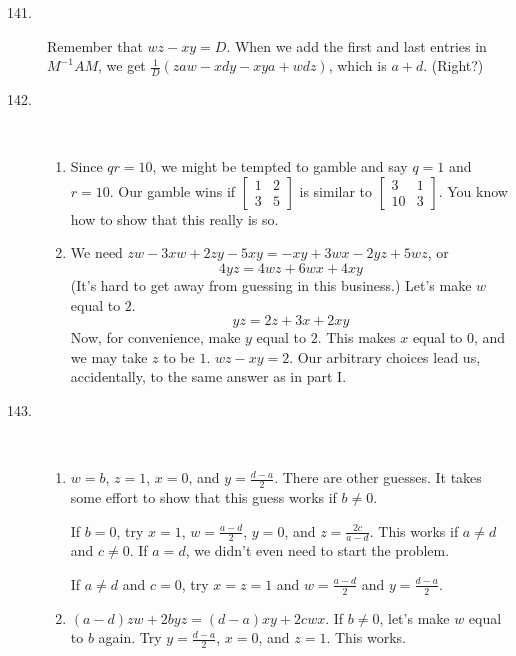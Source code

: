 \documentclass{article}
\begin{document}
\begin{description}
  \item[141.] Remember that $wz - xy = D$. When we add the first and last entries in $M^{-1} AM$, we get $\frac{1}{D} ( zaw-xdy-xya+wdz )$, which is $a+d$. (Right?)

  \item[142.] $\ $
    \begin{enumerate}[\hspace{1cm}(I)]
      \item Since $qr = 10$, we might be tempted to gamble and say $q = 1$ and $r = 10$. Our gamble wins if $\begin{bmatrix} 1 & 2 \\ 3 & 5 \end{bmatrix}$ is similar to $\begin{bmatrix} 3 & 1 \\ 10 & 3 \end{bmatrix}$. You know how to show that this really is so.
      \item We need $zw - 3xw + 2zy -5xy = -xy + 3wx - 2yz + 5wz$, or
        \begin{equation*}
        4yz = 4wz + 6wx + 4xy
        \end{equation*}
        (It's hard to get away from guessing in this business.) Let's make $w$ equal to $2$.
        \begin{equation*}
        yz = 2z + 3x + 2xy
        \end{equation*}
        Now, for convenience, make $y$ equal to $2$. This makes $x$ equal to $0$, and we may take $z$ to be $1$. $wz-xy=2$. Our arbitrary choices lead us, accidentally, to the same answer as in part I.
    \end{enumerate}

  \item[143.] $\ $
    \begin{enumerate}[\hspace{1cm}(I)]

      \item $w=b$, $z=1$, $x=0$, and $y = \frac{d-a}{2}$. There are other guesses. It takes some effort to show that this guess works if $b \neq 0$.

        If $b=0$, try $x=1$, $w = \frac{a-d}{2}$, $y=0$, and $z=\frac{2c}{a-d}$. This works if $a \neq d$ and $c \neq 0$. If $a=d$, we didn't even need to start the problem.

        If $a \neq d$ and $c=0$, try $x=z=1$ and $w = \frac{a-d}{2}$ and $y = \frac{d-a}{2}$.

      \item $(a-d)zw + 2byz = (d-a)xy + 2cwx$. If $b \neq 0$, let's make $w$ equal to $b$ again. Try $y = \frac{d-a}{2}$, $x=0$, and $z=1$. This works.


\end{enumerate}
\end{description}
\end{document}
